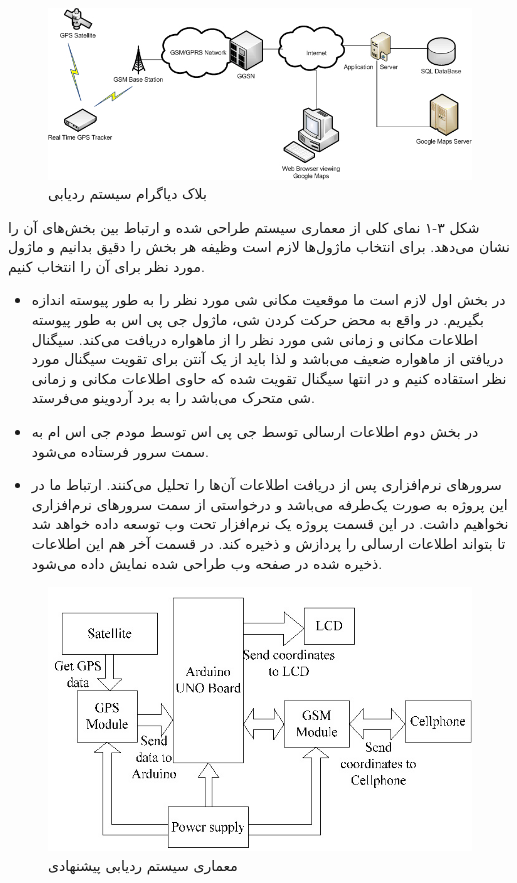 \begin{figure}[!h]
	\centerline{\includegraphics[width=.7\textwidth]{GPS_Tracker}}
	\caption{بلاک دیاگرام سیستم ردیابی \cite{Mohamad2016}}
\end{figure}
شکل ۳-۱ نمای کلی از معماری سیستم طراحی شده و ارتباط بین بخش‌های آن را نشان می‌دهد. برای انتخاب ماژول‌ها لازم است وظیفه هر بخش را دقیق بدانیم و ماژول مورد نظر برای آن را انتخاب کنیم.
\begin{itemize}
	\item 
	در بخش اول لازم است ما موقعیت مکانی شی مورد نظر را به طور پیوسته اندازه بگیریم. در واقع به محض حرکت کردن شی، ماژول جی پی اس به طور پیوسته اطلاعات مکانی و زمانی شی مورد نظر را از ماهواره دریافت می‌کند. سیگنال دریافتی از ماهواره ضعیف می‌باشد و لذا باید از یک آنتن برای تقویت سیگنال مورد نظر استقاده کنیم و در انتها سیگنال تقویت شده که حاوی اطلاعات مکانی و زمانی شی متحرک می‌باشد را به برد آردوینو می‌فرستد.
	\item 
	در بخش دوم اطلاعات ارسالی توسط جی پی اس توسط مودم جی اس ام به سمت سرور فرستاده می‌شود.
	\item 
	سرورهای نرم‌افزاری پس از دریافت اطلاعات آن‌ها را تحلیل می‌کنند. ارتباط ما در این پروژه به صورت یک‌طرفه می‌باشد و درخواستی از سمت سرورهای نرم‌افزاری نخواهیم داشت. در این قسمت پروژه یک نرم‌افزار تحت وب توسعه داده خواهد شد تا بتواند اطلاعات ارسالی را پردازش و ذخیره کند. در قسمت آخر هم این اطلاعات ذخیره شده در صفحه وب طراحی شده نمایش داده می‌شود. 	 
\end{itemize}
\begin{figure}[!h]
	\centerline{\includegraphics[width=.6\textwidth]{blockdiagram}}
	\caption{معماری سیستم ردیابی پیشنهادی \cite{Rahman2016}}
\end{figure}
